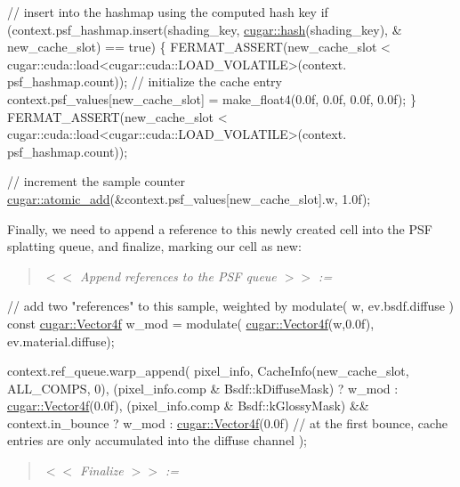 \begin{DoxyCodeInclude}
            \textcolor{comment}{// insert into the hashmap using the computed hash key}
            \textcolor{keywordflow}{if} (context.psf\_hashmap.insert(shading\_key, \hyperlink{group___basic_ga4c88b92d7c3a2616868a11282da2be2f}{cugar::hash}(shading\_key), &
      new\_cache\_slot) == \textcolor{keyword}{true})
            \{
                FERMAT\_ASSERT(new\_cache\_slot < cugar::cuda::load<cugar::cuda::LOAD\_VOLATILE>(context.
      psf\_hashmap.count));
                \textcolor{comment}{// initialize the cache entry}
                context.psf\_values[new\_cache\_slot] = make\_float4(0.0f, 0.0f, 0.0f, 0.0f);
            \}
            FERMAT\_ASSERT(new\_cache\_slot < cugar::cuda::load<cugar::cuda::LOAD\_VOLATILE>(context.
      psf\_hashmap.count));

            \textcolor{comment}{// increment the sample counter}
            \hyperlink{group___atomics_ga0c9d949be7ac5b6f27a232c7cd27a05c}{cugar::atomic\_add}(&context.psf\_values[new\_cache\_slot].w, 1.0f);
\end{DoxyCodeInclude}
 \begin{DoxyParagraph}{}
Finally, we need to append a reference to this newly created cell into the P\+SF splatting queue, and finalize, marking our cell as new\+:
\end{DoxyParagraph}
\label{_p_s_f_p_t_page_Append_references_to_the_PSF_queue_anchor}%
%
\begin{quote}
{\itshape  $<$$<$ Append references to the P\+SF queue $>$$>$ \+:= }

\end{quote}

\begin{DoxyCodeInclude}
            \textcolor{comment}{// add two "references" to this sample, weighted by modulate( w, ev.bsdf.diffuse )}
            \textcolor{keyword}{const} \hyperlink{structcugar_1_1_vector}{cugar::Vector4f} w\_mod = modulate(
      \hyperlink{structcugar_1_1_vector}{cugar::Vector4f}(w,0.0f), ev.material.diffuse);

            context.ref\_queue.warp\_append(
                pixel\_info,
                CacheInfo(new\_cache\_slot, ALL\_COMPS, 0),
                (pixel\_info.comp & Bsdf::kDiffuseMask)                     ? w\_mod : 
      \hyperlink{structcugar_1_1_vector}{cugar::Vector4f}(0.0f),
                (pixel\_info.comp & Bsdf::kGlossyMask) && context.in\_bounce ? w\_mod : 
      \hyperlink{structcugar_1_1_vector}{cugar::Vector4f}(0.0f)
                    \textcolor{comment}{// at the first bounce, cache entries are only accumulated into the diffuse channel}
            );
\end{DoxyCodeInclude}
 \label{_p_s_f_p_t_page_Finalize_anchor}%
%
\begin{quote}
{\itshape  $<$$<$ Finalize $>$$>$ \+:= }

\end{quote}

